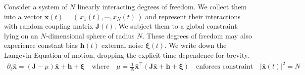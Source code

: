 Consider a system of $N$ linearly interacting degrees of freedom. We collect them into a vector $\mathbf{\bar x}(t) = \left(\,x_1(t),\cdots, x_N(t)\,\right)$ and represent their interactions with random coupling matrix $\mathbf{J}(t)$. We subject them to a global constraint: lying on an $N$-dimensional sphere of radius $N$. These degrees of freedom may also experience constant bias $\mathbf{h}(t)$ external noise $\boldsymbol\xi(t)$. We write down the Langevin Equation of motion, dropping the explicit time dependence for brevity.
\begin{align}
\partial_t\mathbf{\bar x} = (\mathbf{J}-\mu)\mathbf{\bar x}+\mathbf{h}+\boldsymbol\xi\quad
\text{where}\quad\mu = \frac{1}{N}\mathbf{\bar x}^{\top}\left(\mathbf{J}\mathbf{\bar x}+\mathbf{h}+\boldsymbol\xi\right)\quad\text{enforces constraint}\quad|\mathbf{\bar x}(t)|^2=N
\end{align}
